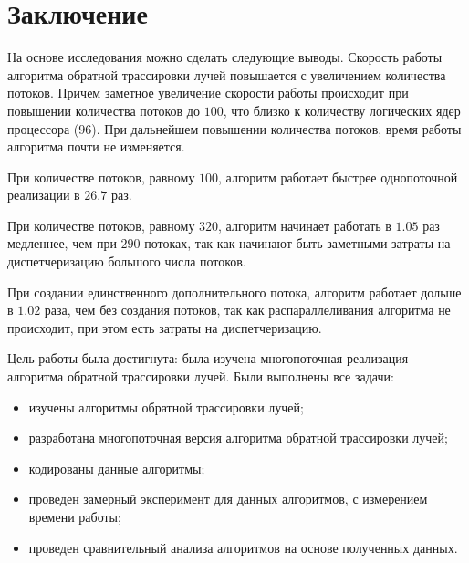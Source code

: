 \chapter*{Заключение}

На основе исследования можно сделать следующие выводы. 
Скорость работы алгоритма обратной трассировки лучей повышается с увеличением количества потоков. 
Причем заметное увеличение скорости работы происходит при повышении количества потоков до $100$, что близко к количеству логических ядер процессора ($96$). 
При дальнейшем повышении количества потоков, время работы алгоритма почти не изменяется.

При количестве потоков, равному $100$, алгоритм работает быстрее однопоточной реализации в $26.7$ раз.

При количестве потоков, равному $320$, алгоритм начинает работать в $1.05$ раз медленнее, чем при $290$ потоках, так как начинают быть заметными затраты на диспетчеризацию большого числа потоков.

При создании единственного дополнительного потока, алгоритм работает дольше в $1.02$ раза, чем без создания потоков, так как распараллеливания алгоритма не происходит, при этом есть затраты на диспетчеризацию.

Цель работы была достигнута: была изучена многопоточная реализация алгоритма обратной трассировки лучей. Были выполнены все задачи:

\begin{itemize}
	\item изучены алгоритмы обратной трассировки лучей;
	\item разработана многопоточная версия алгоритма обратной трассировки лучей;
	\item кодированы данные алгоритмы;
	\item проведен замерный эксперимент для данных алгоритмов, с измерением времени работы; 
	\item проведен сравнительный анализа алгоритмов на основе полученных данных.
\end{itemize}


\newpage